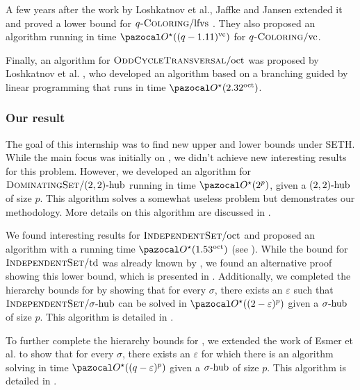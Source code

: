 \medskip

A few years after the work by Loshkatnov et al., Jaffke and Jansen extended it and proved a lower bound for $q\prob{-Coloring}/\lfvs$ \cite{jaffke2017fine}. They also proposed an algorithm running in time $\O^\star((q - 1.11)^\vc)$ for $q\prob{-Coloring}/\vc$.

\medskip

Finally, an algorithm for $\prob{OddCycleTransversal}/\oct$ was proposed by Loshkatnov et al. \cite{lokshtanov2012subexponential}, who developed an algorithm based on a branching guided by linear programming that runs in time $\O^\star(2.32^\oct)$. 

\subsubsection*{Our result}


The goal of this internship was to find new upper and lower bounds under SETH. While the main focus was initially on , we didn't achieve new interesting results for this problem. However, we developed an algorithm for $\prob{DominatingSet}/\sdhub[2, 2]$ running in time $\O^\star(2^p)$, given a $\sdhub[2,2]$ of size $p$. This algorithm solves a somewhat useless problem but demonstrates our methodology. More details on this algorithm are discussed in .

\medskip

We found interesting results for $\prob{IndependentSet}/\oct$ and proposed an algorithm with a running time $\O^\star(1.53^\oct)$ (see ). While the bound for $\prob{IndependentSet}/\td$ was already known by , we found an alternative proof showing this lower bound, which is presented in . Additionally, we completed the hierarchy bounds for  by showing that for every $\sigma$, there exists an $\varepsilon$ such that $\prob{IndependentSet}/\shub$ can be solved in $\O^\star((2- \varepsilon)^p)$ given a $\shub$ of size $p$. This algorithm is detailed in .

\medskip

To further complete the hierarchy bounds for , we extended the work of Esmer et al. to show that for every $\sigma$, there exists an $\varepsilon$ for which there is an algorithm solving  in time $\O^\star((q-\varepsilon)^p)$ given a $\shub$ of size $p$. This algorithm is detailed in .